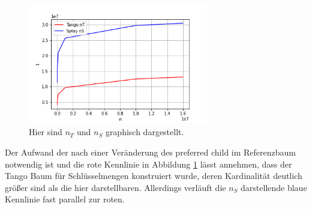 \documentclass[a4paper,12pt]{article}
\begin{document}
\begin{figure}[H]
	\centering
	\includegraphics[width=0.7\textwidth]{"Medien/laufzeittest/diagramm/nT"}
	\caption{Hier sind $n_T$ und $n_S$ graphisch dargestellt.}
	\label{fig:nT}
\end{figure}
\noindent Der Aufwand der nach einer Veränderung des preferred child im Referenzbaum notwendig ist und die rote Kennlinie in Abbildung \ref{fig:nT} lässt annehmen, dass der Tango Baum für Schlüsselmengen konstruiert wurde, deren Kardinalität deutlich größer sind als die hier darstellbaren. Allerdings verläuft die $n_S$ darstellende blaue Kennlinie fast parallel zur roten.      
\end{document}
